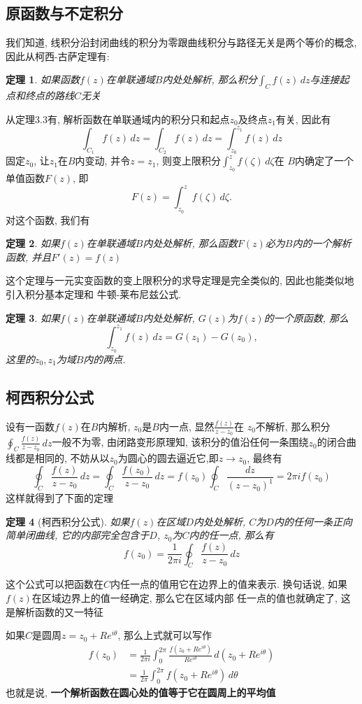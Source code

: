\documentclass[12pt, a4paper, oneside]{ctexart}
\theoremstyle{plain}
\newtheorem{theorem}{定理}[section]
\theoremstyle{definition}
\theoremstyle{definition}
\begin{document}
\subsection{原函数与不定积分}
我们知道, 线积分沿封闭曲线的积分为零跟曲线积分与路径无关是两个等价的概念, 因此从柯西-古萨定理有:
\begin{theorem}
    如果函数$f(z)$在单联通域$B$内处处解析, 那么积分$\int_Cf(z)\,dz$与连接起点和终点的路线$C$无关
\end{theorem}
从定理3.3有, 解析函数在单联通域内的积分只和起点$z_0$及终点$z_1$有关, 因此有
\[
\int_{C_1}f(z)\,dz=\int_{C_2}f(z)\,dz=\int_{z_0}^{z_1}f(z)\,dz
\]
固定$z_0$, 让$z_1$在$B$内变动, 并令$z=z_1$, 则变上限积分$\int_{z_0}^{z}f(\zeta)\,d\zeta$在
$B$内确定了一个单值函数$F(z)$, 即
\[
F(z)=\int_{z_0}^{z}f(\zeta)\,d\zeta.
\]
对这个函数, 我们有
\begin{theorem}
    如果$f(z)$在单联通域$B$内处处解析, 那么函数$F(z)$必为$B$内的一个解析函数, 并且$F'(z)=f(z)$
\end{theorem}
\noindent 这个定理与一元实变函数的变上限积分的求导定理是完全类似的, 因此也能类似地引入积分基本定理和
牛顿-莱布尼兹公式.
\begin{theorem}
    如果$f(z)$在单联通域$B$内处处解析, $G(z)$为$f(z)$的一个原函数, 那么
    \[
        \int_{z_0}^{z_1}f(z)\,dz=G(z_1)-G(z_0),
    \]
    这里的$z_0,z_1$为域$B$内的两点.
\end{theorem}
\subsection{柯西积分公式}
设有一函数$f(z)$在$B$内解析, $z_0$是$B$内一点, 显然$\frac{f(z)}{z-z_0}$在
$z_0$不解析, 那么积分$\oint_{C}\frac{f(z)}{z-z_0}\,dz$一般不为零, 由闭路变形原理知, 
该积分的值沿任何一条围绕$z_0$的闭合曲线都是相同的, 不妨从以$z_0$为圆心的圆去逼近它,即$z\to z_0$, 最终有
\[
\oint_{C}\frac{f(z)}{z-z_0}\,dz=\oint_{C}\frac{f(z_0)}{z-z_0}\,dz=f(z_0)\oint_{C}\frac{dz}{(z-z_0)^1}=2\pi if(z_0)
\]
这样就得到了下面的定理
\begin{theorem}[柯西积分公式]
    如果$f(z)$在区域$D$内处处解析, $C$为$D$内的任何一条正向简单闭曲线, 它的内部完全包含于$D$, $z_0$为$C$内的任一点, 那么有
    \[
        f(z_0)=\frac{1}{2\pi i}\oint_{C}\frac{f(z)}{z-z_0}\,dz
    \]
\end{theorem}
这个公式可以把函数在$C$内任一点的值用它在边界上的值来表示. 换句话说, 如果$f(z)$在区域边界上的值一经确定, 那么它在区域内部
任一点的值也就确定了, 这是解析函数的又一特征

如果$C$是圆周$z=z_0+Re^{i\theta}$, 那么上式就可以写作
\begin{align*}
f(z_0) &= \frac{1}{2\pi i}\int_{0}^{2\pi}\frac{f(z_0+Re^{i\theta})}{Re^{i\theta}}\,d(z_0+Re^{i\theta})\\
&= \frac{1}{2\pi}\int_{0}^{2\pi}f(z_0+Re^{i\theta})\,d\theta
\end{align*}
\noindent 也就是说, \textbf{一个解析函数在圆心处的值等于它在圆周上的平均值}
\end{document}
